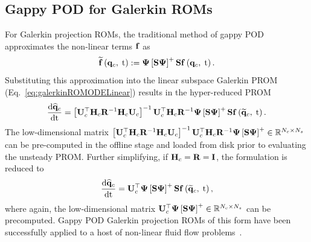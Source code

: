 \subsection{Gappy POD for Galerkin ROMs}
%
For Galerkin projection ROMs, the traditional method of gappy POD approximates the non-linear terms $\mathbf{f}$ as
%
\begin{equation}
	\rhsApproxFunc{\consVec, \; \timeVar} \defEq \deimBasis \left[ \sampMat \deimBasis \right]^+ \sampMat \rhsFunc{\consVec, \; \timeVar}.
\end{equation}
%
Substituting this approximation into the linear subspace Galerkin PROM (Eq.~\ref{eq:galerkinROMODELinear}) results in the hyper-reduced PROM
%
\begin{equation}\label{eq:galerkinROMHR}
    \ode{\consVecCoef}{\timeVar} = \left[\consTrial^\top \consScale \resScaleInv \consScale \consTrial\right]^{-1} \consTrial^\top \consScale \resScaleInv \deimBasis \left[ \sampMat \deimBasis \right]^+ \sampMat \rhsFunc{\consVecRom, \; \timeVar}.
\end{equation}
%
The low-dimensional matrix $\left[\consTrial^\top \consScale \resScaleInv \consScale \consTrial\right]^{-1} \consTrial^\top \consScale \resScaleInv \deimBasis \left[ \sampMat \deimBasis \right]^+ \inRTwo{\numConsModes}{\numSamps}$ can be pre-computed in the offline stage and loaded from disk prior to evaluating the unsteady PROM. Further simplifying, if $\consScale = \resScale = \identMat$, the formulation is reduced to
%
\begin{equation}
    \ode{\consVecCoef}{\timeVar} = \consTrial^\top \deimBasis \left[ \sampMat \deimBasis \right]^+ \sampMat \rhsFunc{\consVecRom, \; \timeVar},
\end{equation}
%
where again, the low-dimensional matrix $\consTrial^\top \deimBasis \left[ \sampMat \deimBasis \right]^+ \inRTwo{\numConsModes}{\numSamps}$ can be precomputed. Gappy POD Galerkin projection ROMs of this form have been successfully applied to a host of non-linear fluid flow problems~\cite{Chaturantabut2011,Stefanescu2013,Wirtz2014,Amsallem2015,Alla2017}.

